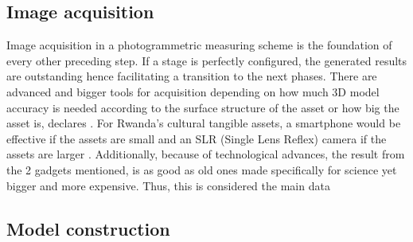 \documentclass[conference]{IEEEtran}
\begin{document}
\subsection{Image acquisition}

Image acquisition in a photogrammetric measuring scheme is the foundation of every other preceding step. If a stage is perfectly configured, the generated results are outstanding hence facilitating a transition to the next phases. There are advanced and bigger tools for acquisition depending on how much 3D model accuracy is needed according to the surface structure of the asset or how big the asset is, declares \cite{Na2022}. For Rwanda’s cultural tangible assets, a smartphone would be effective if the assets are small \cite{An2022} and an SLR (Single Lens Reflex) camera if the assets are larger \cite{cam1}. Additionally, because of technological advances, the result from the 2 gadgets mentioned, is as good as old ones made specifically for science yet bigger and more expensive. Thus, this is considered the main data 

\subsection{Model construction}
\end{document}
